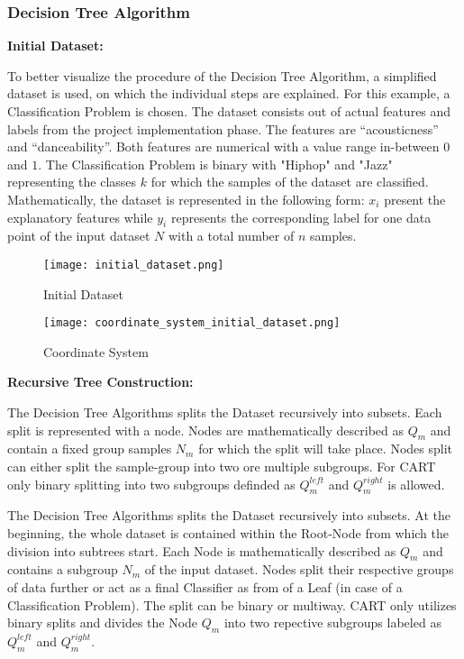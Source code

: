 \subsubsection{Decision Tree Algorithm}

\textbf{Initial Dataset:}

To better visualize the procedure of the Decision Tree Algorithm, a simplified dataset is used, 
on which the individual steps are explained. For this example, a Classification Problem is chosen. 
The dataset consists out of actual features and labels from the project implementation phase. The 
features are “acousticness” and “danceability”. Both features are numerical with a value range 
in-between \(0\) and \(1\). The Classification Problem is binary with "Hiphop" and "Jazz" representing 
the classes \(k\) for which the samples of the dataset are classified. Mathematically, the dataset 
is represented in the following form: \(x_{i}\) present the explanatory features while \(y_{i}\) represents 
the corresponding label for one data point of the input dataset \(N\) with a total number of \(n\) 
samples.

\begin{figure}[H]
    \centering
    \caption[]{Initial Dataset}
	\label{fig:initial_dataset}
    \texttt{[image: initial\_dataset.png]}
\end{figure}

\begin{figure}[H]
    \centering
    \caption[]{Coordinate System}
	\label{fig:coordinate_system_initial_dataset}
    \texttt{[image: coordinate\_system\_initial\_dataset.png]}
\end{figure}

\textbf{Recursive Tree Construction:}

The Decision Tree Algorithms splits the Dataset recursively into subsets. Each split is represented with 
a node. Nodes are mathematically described as \(Q_{m}\) and contain a fixed group samples \(N_{m}\) 
for which the split will take place. Nodes split can either split the sample-group into two ore multiple 
subgroups. For CART only binary splitting into two subgroups definded as \(Q^{left}_{m}\) and \(Q^{right}_{m}\)
is allowed. 

The Decision Tree Algorithms splits the Dataset recursively into subsets. At the beginning, the whole dataset is 
contained within the Root-Node from which the division into subtrees start. Each Node is mathematically described
as \(Q_{m}\) and contains a subgroup \(N_{m}\) of the input dataset. Nodes split their respective groups of data 
further or act as a final Classifier as from of a Leaf (in case of a Classification Problem). The split can be 
binary or multiway. CART only utilizes binary splits and divides the Node \(Q_{m}\) into two repective subgroups 
labeled as \(Q^{left}_{m}\) and \(Q^{right}_{m}\). 

